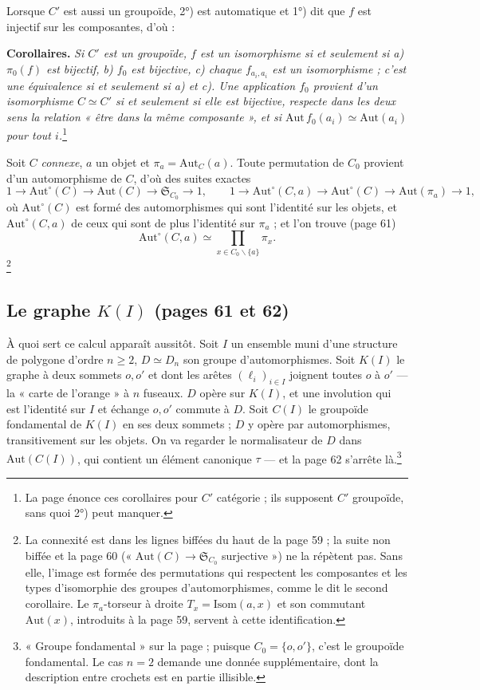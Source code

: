 \documentclass[11pt,a4paper]{article}
\begin{document}
Lorsque $C'$ est aussi un groupoïde, 2°) est automatique et 1°) dit que $f$ est
injectif sur les composantes, d'où :

\textbf{Corollaires.} \emph{Si $C'$ est un groupoïde, $f$ est un isomorphisme si
et seulement si a) $\pi_{0}(f)$ est bijectif, b) $f_{0}$ est bijective, c) chaque
$f_{a_{i}, a_{i}}$ est un isomorphisme ; c'est une équivalence si et seulement
si a) et c). Une application $f_{0}$ provient d'un isomorphisme $C \simeq C'$
si et seulement si elle est bijective, respecte dans les deux sens la relation
« être dans la même composante », et si $\mathrm{Aut}\, f_{0}(a_{i}) \simeq
\mathrm{Aut}(a_{i})$ pour tout $i$.}\footnote{La page énonce ces corollaires
pour $C'$ catégorie ; ils supposent $C'$ groupoïde, sans quoi 2°) peut
manquer.}

Soit $C$ \emph{connexe}, $a$ un objet et $\pi_{a} = \mathrm{Aut}_{C}(a)$. Toute
permutation de $C_{0}$ provient d'un automorphisme de $C$, d'où des suites
exactes
\[
1 \to \mathrm{Aut}^{\circ}(C) \to \mathrm{Aut}(C) \to \mathfrak{S}_{C_{0}} \to 1,
\qquad
1 \to \mathrm{Aut}^{\circ}(C, a) \to \mathrm{Aut}^{\circ}(C) \to \mathrm{Aut}(\pi_{a})
\to 1,
\]
où $\mathrm{Aut}^{\circ}(C)$ est formé des automorphismes qui sont l'identité sur
les objets, et $\mathrm{Aut}^{\circ}(C, a)$ de ceux qui sont de plus l'identité
sur $\pi_{a}$ ; et l'on trouve (page 61)
\[
\mathrm{Aut}^{\circ}(C, a) \simeq \prod_{x \in C_{0} \smallsetminus \{a\}} \pi_{x} .
\]
\footnote{La connexité est dans les lignes biffées du haut de la page 59 ; la
suite non biffée et la page 60 (« $\mathrm{Aut}(C) \to \mathfrak{S}_{C_{0}}$
surjective ») ne la répètent pas. Sans elle, l'image est formée des
permutations qui respectent les composantes et les types d'isomorphie des
groupes d'automorphismes, comme le dit le second corollaire. Le
$\pi_{a}$-torseur à droite $T_{x} = \mathrm{Isom}(a, x)$ et son commutant
$\mathrm{Aut}(x)$, introduits à la page 59, servent à cette identification.}

\subsection*{Le graphe $K(I)$ (pages 61 et 62)}

À quoi sert ce calcul apparaît aussitôt. Soit $I$ un ensemble muni d'une
structure de polygone d'ordre $n \geqslant 2$, $D \simeq D_{n}$ son groupe
d'automorphismes. Soit $K(I)$ le graphe à deux sommets $o, o'$ et dont les
arêtes $(\ell_{i})_{i \in I}$ joignent toutes $o$ à $o'$ --- la « carte de
l'orange » à $n$ fuseaux. $D$ opère sur $K(I)$, et une involution qui est
l'identité sur $I$ et échange $o, o'$ commute à $D$. Soit $C(I)$ le groupoïde
fondamental de $K(I)$ en ses deux sommets ; $D$ y opère par automorphismes,
transitivement sur les objets. On va regarder le normalisateur de $D$ dans
$\mathrm{Aut}(C(I))$, qui contient un élément canonique $\tau$ --- et la page 62
s'arrête là.\footnote{« Groupe fondamental » sur la page ; puisque $C_{0} = \{o,
o'\}$, c'est le groupoïde fondamental. Le cas $n = 2$ demande une donnée
supplémentaire, dont la description entre crochets est en partie illisible.}
\end{document}
